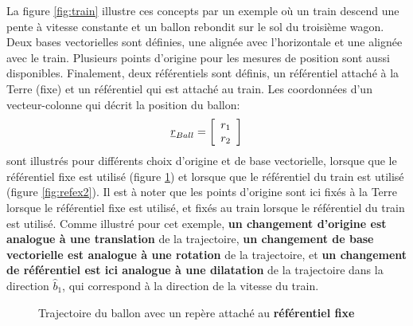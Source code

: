 La figure \ref{fig:train} illustre ces concepts par un exemple où un train descend une pente à vitesse constante et un ballon rebondit sur le sol du troisième wagon. Deux bases vectorielles sont définies, une alignée avec l'horizontale et une alignée avec le train. Plusieurs points d'origine pour les mesures de position sont aussi disponibles. Finalement, deux référentiels sont définis, un référentiel attaché à la Terre (fixe) et un référentiel qui est attaché au train. Les coordonnées d'un vecteur-colonne qui décrit la position du ballon:
\begin{equation}
	\underline{r}_{Ball} = \left[ \begin{array}{c} r_1 \\ r_2 \end{array} \right]
\end{equation}
sont illustrés pour différents choix d'origine et de base vectorielle, lorsque que le référentiel fixe est utilisé (figure \ref{fig:refex1}) et lorsque que le référentiel du train est utilisé (figure \ref{fig:refex2}). Il est à noter que les points d'origine sont ici fixés à la Terre lorsque le référentiel fixe est utilisé, et fixés au train lorsque le référentiel du train est utilisé. Comme illustré pour cet exemple, \textbf{un changement d'origine est analogue à une translation} de la trajectoire, \textbf{un changement de base vectorielle est analogue à une rotation} de la trajectoire, et \textbf{un changement de référentiel est ici analogue à une dilatation} de la trajectoire dans la direction $\hat{b}_1$, qui correspond à la direction de la vitesse du train.

\begin{figure}[H]
	\centering
	 \hspace{20pt}
	 \hspace{190pt}
	 \hspace{20pt}
	\caption{Trajectoire du ballon avec un repère attaché au \textbf{référentiel fixe}}
	\label{fig:refex1}
\end{figure}

